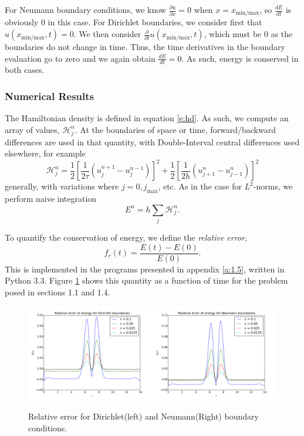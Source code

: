 \documentclass[10pt]{article}
\newcommand{\ujpn}{u_{j+1}^{n}}
\newcommand{\ujmn}{u_{j-1}^{n}}
\newcommand{\ujnp}{u_{j}^{n+1}}
\newcommand{\ujnm}{u_{j}^{n-1}}
\begin{document}
For Neumann boundary conditions, we know $\frac{\partial u}{\partial x} =0 $ when $x=x_\text{min/max}$,
so $\frac{dE}{dt}$ is obviously $0$ in this case. 
For Dirichlet boundaries, we consider first that $u(x_\text{min/max},t) = 0$. We then consider
$\frac{\partial}{\partial t}u(x_\text{min/max},t)$, which must be $0$ as the boundaries do not change
in time. Thus, the time derivatives in the boundary evaluation go to zero and we again obtain
$\frac{dE}{dt} = 0$. As such, energy is conserved in both cases.
\subsubsection*{Numerical Results}
The Hamiltonian density is defined in equation \ref{e:hd}. As such, we compute an
array of values, $\mathcal{H}_j^n$. At the boundaries of space or time,
forward/backward differences are used in that quantity, with Double-Interval
central differences used elsewhere, for example
$$ \mathcal{H}_j^n = \frac{1}{2}\left[\frac{1}{2\tau}\left(\ujnp - \ujnm\right)\right]^2
+ \frac{1}{2}\left[ \frac{1}{2h} \left(\ujpn - \ujmn\right)\right]^2 $$
generally, with variations where $j = 0 , j_\text{max}$, etc.
As in the case for $L^2$-norms, we perform naive integration
$$E^n = h\sum_j \mathcal{H}_j^n. $$

\noindent To quantify the conservation of energy, we define the {\it relative error},
\begin{equation}
f_r (t) = \frac{E(t) - E(0)}{E(0)}.
\label{e:relerr}
\end{equation}
This is implemented in the programs presented in appendix \ref{a:1.5}, written in Python 3.3.
Figure \ref{f:relerr} shows this quantity as a function of time for the problem
posed in sections 1.1 and 1.4.

\begin{figure}
  \centering
  \includegraphics[width=0.5\textwidth]{1/Ed.pdf}\includegraphics[width=0.5\textwidth]{1/En.pdf}
  \caption{Relative error for Dirichlet(left) and Neumann(Right) boundary conditions.}
  \label{f:relerr}
\end{figure}
\end{document}
